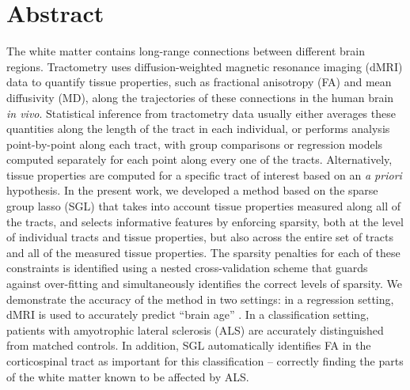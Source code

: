 \section*{Abstract}

The white matter contains long-range connections between different brain
regions. Tractometry uses diffusion-weighted magnetic resonance imaging (dMRI)
data to quantify tissue properties, such as fractional anisotropy (FA) and mean
diffusivity (MD), along the trajectories of these connections in the human brain
\emph{in vivo}\cite{yeatman2012tract}. Statistical inference from tractometry
data usually either averages these quantities along the length of the tract in
each individual, or performs analysis point-by-point along each tract, with
group comparisons or regression models computed separately for each point along
every one of the tracts. Alternatively, tissue properties are computed for a
specific tract of interest based on an \emph{a priori} hypothesis. In the
present work, we developed a method based on the sparse group lasso (SGL)
\cite{simon2013sparse} that takes into account tissue properties measured along
all of the tracts, and selects informative features by enforcing sparsity, both
at the level of individual tracts and tissue properties, but also across the
entire set of tracts and all of the measured tissue properties. The sparsity
penalties for each of these constraints is identified using a nested
cross-validation scheme that guards against over-fitting and simultaneously
identifies the correct levels of sparsity. We demonstrate the accuracy of the
method in two settings: in a regression setting, dMRI is used to accurately
predict ``brain age'' \cite{yeatman2014lifespan, Brown2012-so}. In a
classification setting, patients with amyotrophic lateral sclerosis (ALS) are
accurately distinguished from matched controls\cite{sarica2017corticospinal}. In
addition, SGL automatically identifies FA in the corticospinal tract as
important for this classification -- correctly finding the parts of the white
matter known to be affected by ALS.

